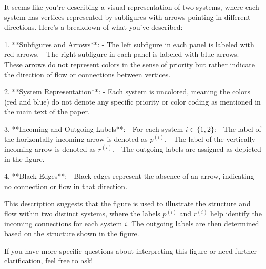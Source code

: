 It seems like you're describing a visual representation of two systems, where each system has vertices represented by subfigures with arrows pointing in different directions. Here's a breakdown of what you've described:

1. **Subfigures and Arrows**:
   - The left subfigure in each panel is labeled with red arrows.
   - The right subfigure in each panel is labeled with blue arrows.
   - These arrows do not represent colors in the sense of priority but rather indicate the direction of flow or connections between vertices.

2. **System Representation**:
   - Each system is uncolored, meaning the colors (red and blue) do not denote any specific priority or color coding as mentioned in the main text of the paper.

3. **Incoming and Outgoing Labels**:
   - For each system \( i \in \{1, 2\} \):
     - The label of the horizontally incoming arrow is denoted as \( p^{(i)} \).
     - The label of the vertically incoming arrow is denoted as \( r^{(i)} \).
   - The outgoing labels are assigned as depicted in the figure.

4. **Black Edges**:
   - Black edges represent the absence of an arrow, indicating no connection or flow in that direction.

This description suggests that the figure is used to illustrate the structure and flow within two distinct systems, where the labels \( p^{(i)} \) and \( r^{(i)} \) help identify the incoming connections for each system \( i \). The outgoing labels are then determined based on the structure shown in the figure.

If you have more specific questions about interpreting this figure or need further clarification, feel free to ask!